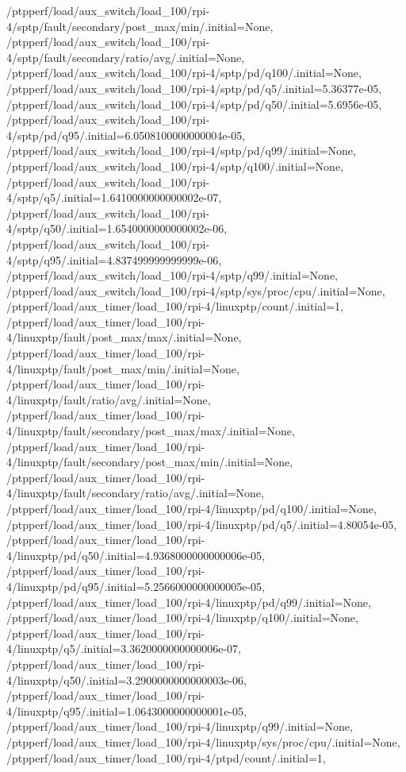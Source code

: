 {    /ptpperf/load/aux_switch/load_100/rpi-4/sptp/fault/secondary/post_max/min/.initial=None,
    /ptpperf/load/aux_switch/load_100/rpi-4/sptp/fault/secondary/ratio/avg/.initial=None,
    /ptpperf/load/aux_switch/load_100/rpi-4/sptp/pd/q100/.initial=None,
    /ptpperf/load/aux_switch/load_100/rpi-4/sptp/pd/q5/.initial=5.36377e-05,
    /ptpperf/load/aux_switch/load_100/rpi-4/sptp/pd/q50/.initial=5.6956e-05,
    /ptpperf/load/aux_switch/load_100/rpi-4/sptp/pd/q95/.initial=6.0508100000000004e-05,
    /ptpperf/load/aux_switch/load_100/rpi-4/sptp/pd/q99/.initial=None,
    /ptpperf/load/aux_switch/load_100/rpi-4/sptp/q100/.initial=None,
    /ptpperf/load/aux_switch/load_100/rpi-4/sptp/q5/.initial=1.6410000000000002e-07,
    /ptpperf/load/aux_switch/load_100/rpi-4/sptp/q50/.initial=1.6540000000000002e-06,
    /ptpperf/load/aux_switch/load_100/rpi-4/sptp/q95/.initial=4.837499999999999e-06,
    /ptpperf/load/aux_switch/load_100/rpi-4/sptp/q99/.initial=None,
    /ptpperf/load/aux_switch/load_100/rpi-4/sptp/sys/proc/cpu/.initial=None,
    /ptpperf/load/aux_timer/load_100/rpi-4/linuxptp/count/.initial=1,
    /ptpperf/load/aux_timer/load_100/rpi-4/linuxptp/fault/post_max/max/.initial=None,
    /ptpperf/load/aux_timer/load_100/rpi-4/linuxptp/fault/post_max/min/.initial=None,
    /ptpperf/load/aux_timer/load_100/rpi-4/linuxptp/fault/ratio/avg/.initial=None,
    /ptpperf/load/aux_timer/load_100/rpi-4/linuxptp/fault/secondary/post_max/max/.initial=None,
    /ptpperf/load/aux_timer/load_100/rpi-4/linuxptp/fault/secondary/post_max/min/.initial=None,
    /ptpperf/load/aux_timer/load_100/rpi-4/linuxptp/fault/secondary/ratio/avg/.initial=None,
    /ptpperf/load/aux_timer/load_100/rpi-4/linuxptp/pd/q100/.initial=None,
    /ptpperf/load/aux_timer/load_100/rpi-4/linuxptp/pd/q5/.initial=4.80054e-05,
    /ptpperf/load/aux_timer/load_100/rpi-4/linuxptp/pd/q50/.initial=4.9368000000000006e-05,
    /ptpperf/load/aux_timer/load_100/rpi-4/linuxptp/pd/q95/.initial=5.2566000000000005e-05,
    /ptpperf/load/aux_timer/load_100/rpi-4/linuxptp/pd/q99/.initial=None,
    /ptpperf/load/aux_timer/load_100/rpi-4/linuxptp/q100/.initial=None,
    /ptpperf/load/aux_timer/load_100/rpi-4/linuxptp/q5/.initial=3.3620000000000006e-07,
    /ptpperf/load/aux_timer/load_100/rpi-4/linuxptp/q50/.initial=3.2900000000000003e-06,
    /ptpperf/load/aux_timer/load_100/rpi-4/linuxptp/q95/.initial=1.0643000000000001e-05,
    /ptpperf/load/aux_timer/load_100/rpi-4/linuxptp/q99/.initial=None,
    /ptpperf/load/aux_timer/load_100/rpi-4/linuxptp/sys/proc/cpu/.initial=None,
    /ptpperf/load/aux_timer/load_100/rpi-4/ptpd/count/.initial=1,
}
